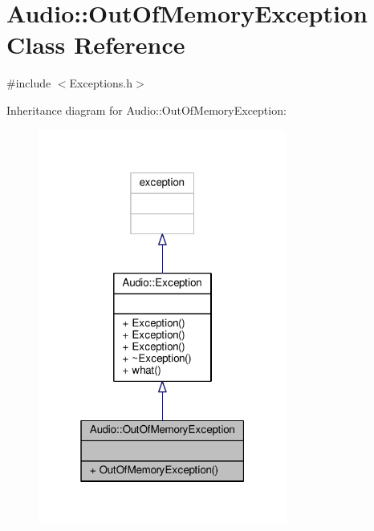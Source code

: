 \hypertarget{classAudio_1_1OutOfMemoryException}{}\section{Audio\+:\+:Out\+Of\+Memory\+Exception Class Reference}
\label{classAudio_1_1OutOfMemoryException}


{\ttfamily \#include $<$Exceptions.\+h$>$}



Inheritance diagram for Audio\+:\+:Out\+Of\+Memory\+Exception\+:
\nopagebreak
\begin{figure}[H]
\begin{center}
\leavevmode
\includegraphics[width=232pt]{d5/db8/classAudio_1_1OutOfMemoryException__inherit__graph}
\end{center}
\end{figure}


